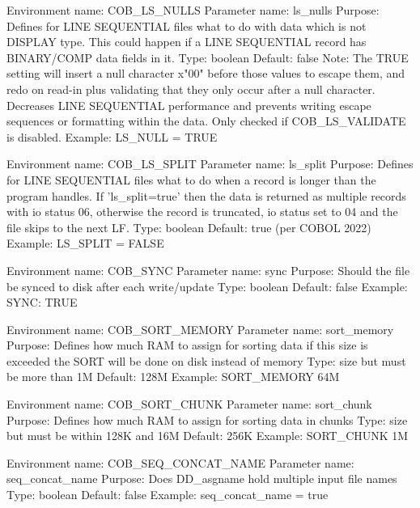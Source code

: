 Environment name:  COB_LS_NULLS
  Parameter name:  ls_nulls
         Purpose:  Defines for LINE SEQUENTIAL files what to do with data
                   which is not DISPLAY type.  This could happen if a LINE
                   SEQUENTIAL record has BINARY/COMP data fields in it.
            Type:  boolean
         Default:  false
            Note:  The TRUE setting will insert a null character x"00" before
                   those values to escape them, and redo on read-in plus
                   validating that they only occur after a null character.
                   Decreases LINE SEQUENTIAL performance and prevents writing
                   escape sequences or formatting within the data.
                   Only checked if COB_LS_VALIDATE is disabled.
         Example:  LS_NULL = TRUE

Environment name:  COB_LS_SPLIT
  Parameter name:  ls_split
         Purpose:  Defines for LINE SEQUENTIAL files what to do when a record
                   is longer than the program handles. If 'ls_split=true' then
                   the data is returned as multiple records with io status 06,
                   otherwise the record is truncated, io status set to 04 and
                   the file skips to the next LF.
            Type:  boolean
         Default:  true (per COBOL 2022)
         Example:  LS_SPLIT = FALSE

Environment name:  COB_SYNC
  Parameter name:  sync
         Purpose:  Should the file be synced to disk after each write/update
            Type:  boolean
         Default:  false
         Example:  SYNC: TRUE

Environment name:  COB_SORT_MEMORY
  Parameter name:  sort_memory
         Purpose:  Defines how much RAM to assign for sorting data
                   if this size is exceeded the  SORT  will be done
                   on disk instead of memory
            Type:  size  but must be more than 1M
         Default:  128M
         Example:  SORT_MEMORY 64M

Environment name:  COB_SORT_CHUNK
  Parameter name:  sort_chunk
         Purpose:  Defines how much RAM to assign for sorting data in chunks
            Type:  size  but must be within 128K and 16M
         Default:  256K
         Example:  SORT_CHUNK 1M

Environment name:  COB_SEQ_CONCAT_NAME
  Parameter name:  seq_concat_name
         Purpose:  Does DD_asgname hold multiple input file names
            Type:  boolean
         Default:  false
         Example:  seq_concat_name = true

